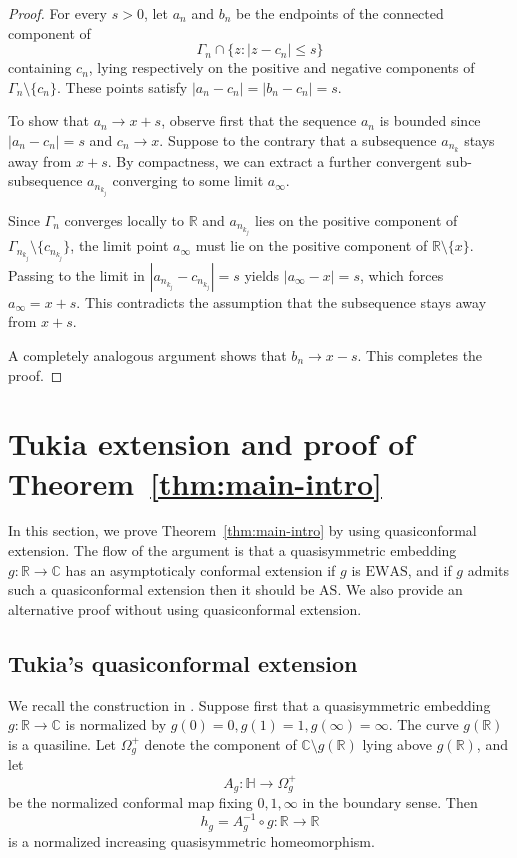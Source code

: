 \documentclass[10pt,a4paper]{amsart}
\numberwithin{equation}{section}
\newcommand{\R}{\mathbb{R}}
\newcommand{\C}{\mathbb{C}}
\newcommand{\Hh}{\mathbb{H}}
\begin{document}
\begin{proof}
For every $s>0$, let $a_n$ and $b_n$ be the endpoints of the connected component of 
\[
\Gamma_n \cap \{z : |z-c_n| \leq s\}
\]
containing $c_n$, lying respectively on the positive and negative components of $\Gamma_n \setminus \{c_n\}$.
These points satisfy $|a_n-c_n|=|b_n-c_n|=s$.

To show that $a_n \to x+s$, observe first that the sequence $a_n$ is bounded since $|a_n - c_n| = s$ and $c_n \to x$. 
Suppose to the contrary that a subsequence $a_{n_k}$ stays away from $x+s$. By compactness, we can extract a further convergent sub-subsequence $a_{n_{k_j}}$ converging to some limit $a_\infty$. 

Since $\Gamma_n$ converges locally to $\mathbb{R}$ and $a_{n_{k_j}}$ lies on the positive component of $\Gamma_{n_{k_j}}\setminus\{c_{n_{k_j}}\}$, the limit point $a_\infty$ must lie on the positive component of $\mathbb{R}\setminus\{x\}$. 
Passing to the limit in $|a_{n_{k_j}} - c_{n_{k_j}}| = s$ yields $|a_\infty - x| = s$, which forces $a_\infty =x+s$. 
This contradicts the assumption that the subsequence stays away from $x+s$.

A completely analogous argument shows that $b_n \to x-s$. This completes the proof.
\end{proof}

\section{Tukia extension and proof of Theorem~\ref{thm:main-intro}}\label{sec:tukia_extension_and_proof_of_theorem_ref_thm_main_intro}

In this section, we prove Theorem~\ref{thm:main-intro} by using quasiconformal extension. 
The flow of the argument is that a quasisymmetric embedding $g\colon \mathbb R \to \mathbb C$ has an asymptoticaly conformal extension if $g$ is $\mathrm{EWAS}$, and if $g$ admits such a quasiconformal extension then it should be $\mathrm{AS}$.
We also provide an alternative proof without using quasiconformal extension.

\subsection{Tukia's quasiconformal extension}

We recall the construction in \cite[Sections~3--5]{TukiaExtension}.  Suppose first that a quasisymmetric embedding $g\colon\R\to\C$ is normalized by $g(0)=0, g(1)=1, g(\infty)=\infty$.
The curve $g(\mathbb R)$ is a quasiline.  
Let $\Omega_g^+$ denote the component of $\mathbb C \setminus g(\mathbb R)$ lying above $g(\mathbb R)$, and let
\[
 A_g\colon\Hh\to\Omega_g^+
\]
be the normalized conformal map fixing $0,1,\infty$ in the boundary sense.
Then
\[
 h_g=A_g^{-1}\circ g\colon\R\to\R
\]
is a normalized increasing quasisymmetric homeomorphism.
\end{document}
